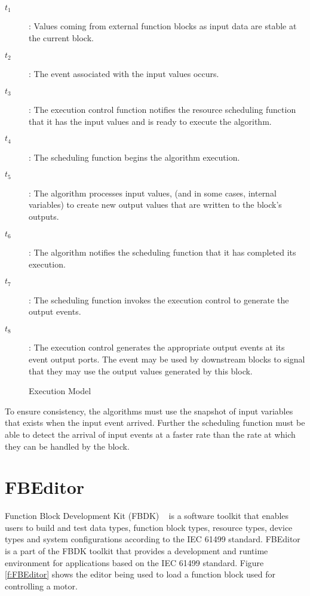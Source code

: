 \begin{description}
\item[$t_1$]: Values coming from external function blocks
as input data are stable at the current block.
\item[$t_2$]: The event associated with the input values occurs.
\item[$t_3$]: The execution control function notifies the resource
scheduling function that it has the input values and is ready to
execute the algorithm.
\item[$t_4$]: The scheduling function begins the algorithm execution.
\item[$t_5$]: The algorithm processes input values, (and in some
cases, internal variables) to create new output values that are
written to the block's outputs.
\item[$t_6$]: The algorithm notifies the scheduling function that it
has completed its execution.
\item[$t_7$]: The scheduling function invokes the execution control
to generate the output events.
\item[$t_8$]: The execution control generates the appropriate output
events at its event output ports. The event may be used by
downstream blocks to signal that they may use the output values
generated by this block.
\end{description}

%
\begin{figure}
\begin{center}
\caption[Execution Model]{Execution Model{\protect
~\cite{IEC-61499}}} \label{f:Execution_Model}
\end{center}
\end{figure}
%

To ensure consistency, the algorithms must use the snapshot of
input variables that exists when the input event arrived. Further
the scheduling function must be able to detect the arrival of
input events at a faster rate than the rate at which they can be
handled by the block.

\section{FBEditor}
Function Block Development Kit (FBDK) ~\cite{FBEditor} is a
software toolkit that enables users to build and test data types,
function block types, resource types, device types and system
configurations according to the IEC 61499 standard. FBEditor is a
part of the FBDK toolkit that provides a development and runtime
environment for applications based on the IEC 61499 standard.
Figure \ref{f:FBEditor} shows the editor being used to load a
function block used for controlling a motor.

